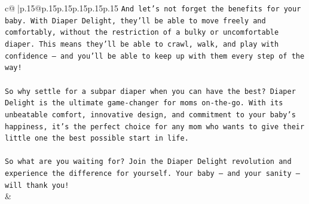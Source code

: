 \documentclass{article}
\begin{document}
{\begin{supertabular}{c@{$\;$}|p{.15\linewidth}@{}p{.15\linewidth}p{.15\linewidth}p{.15\linewidth}p{.15\linewidth}p{.15\linewidth}}
{{{\texttt{And let's not forget the benefits for your baby. With Diaper Delight, they'll be able to move freely and comfortably, without the restriction of a bulky or uncomfortable diaper. This means they'll be able to crawl, walk, and play with confidence – and you'll be able to keep up with them every step of the way!} \\
\\ 
\texttt{So why settle for a subpar diaper when you can have the best? Diaper Delight is the ultimate game{-}changer for moms on{-}the{-}go. With its unbeatable comfort, innovative design, and commitment to your baby's happiness, it's the perfect choice for any mom who wants to give their little one the best possible start in life.} \\
\\ 
\texttt{So what are you waiting for? Join the Diaper Delight revolution and experience the difference for yourself. Your baby – and your sanity – will thank you!} \\
            }
        }
    }
    & \\ \\


\end{supertabular}}
\end{document}
